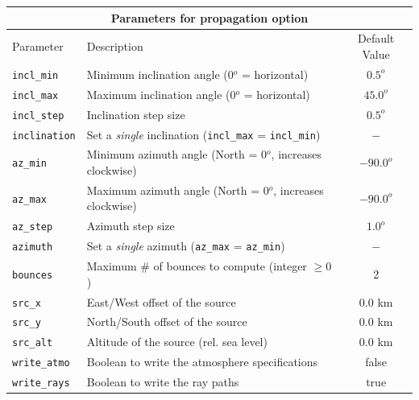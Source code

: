 \documentclass[10pt]{article}
\begin{document}
\begin{tabular}{ | l | l | c | }
  \hline
  \multicolumn{3}{|c|}{\textbf{Parameters for propagation option}} \\
  \hline
  Parameter & Description & Default Value \\
  \hline \hline
 \verb=incl_min= 		& Minimum inclination angle (0\(^o\) = horizontal)				& \(0.5^o\)	\\
 \verb=incl_max= 		& Maximum inclination angle (0\(^o\) = horizontal)				& \(45.0^o\) \\
 \verb=incl_step=  		& Inclination step size									& \(0.5^o\) \\
 \verb=inclination=		& Set a \textit{single} inclination (\verb#incl_max# = \verb#incl_min#)	& \(-\) \\ \hline
 \verb=az_min= 		& Minimum azimuth angle (North = 0\(^o\), increases clockwise)	& \(-90.0^o\)	\\
 \verb=az_max= 		& Maximum azimuth angle (North = 0\(^o\), increases clockwise)	& \(-90.0^o\) \\
 \verb=az_step=  		& Azimuth step size										& \(1.0^o\) \\ 
 \verb=azimuth=		& Set a \textit{single} azimuth  (\verb#az_max# = \verb#az_min#)	& \(-\) \\ \hline
 \verb=bounces=		& Maximum \# of bounces to compute (integer \(\geq 0\)) 			& 2 \\ \hline
 \verb=src_x=  			& East/West offset of the source							& \(0.0\) km \\
 \verb=src_y=  			& North/South offset of the source							& \(0.0\) km \\
 \verb=src_alt=  		& Altitude of the source (rel. sea level)						& \(0.0\) km \\ \hline
 \verb=write_atmo=		& Boolean to write the atmosphere specifications				& false \\
 \verb=write_rays=		& Boolean to write the ray paths							& true \\  \hline
 \end{tabular}

\vspace{0.01\textheight}
\end{document}
